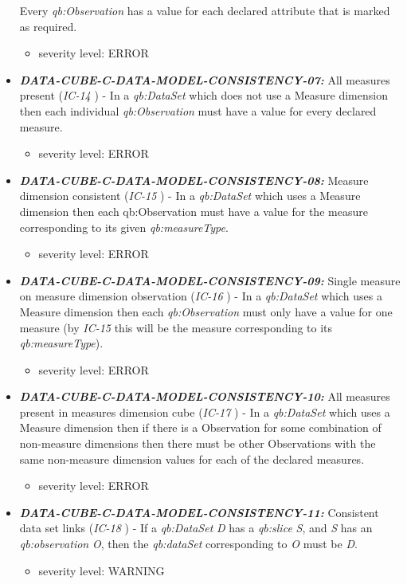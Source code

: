 \documentclass{llncs}
\begin{document}
\begin{itemize}
	Every \emph{qb:Observation} has a value for each declared attribute that is marked as required. 
	\begin{itemize}
		\item severity level: ERROR
	\end{itemize}
	\item \textbf{{\em DATA-CUBE-C-DATA-MODEL-CONSISTENCY-07:}}
	All measures present (\emph{IC-14} \cite{CyganiakReynolds2014}) -
	In a \emph{qb:DataSet} which does not use a Measure dimension then each individual \emph{qb:Observation} must have a value for every declared measure. 
	\begin{itemize}
		\item severity level: ERROR
	\end{itemize}
	\item \textbf{{\em DATA-CUBE-C-DATA-MODEL-CONSISTENCY-08:}}
	Measure dimension consistent (\emph{IC-15} \cite{CyganiakReynolds2014}) -
	In a \emph{qb:DataSet} which uses a Measure dimension then each qb:Observation must have a value for the measure corresponding to its given \emph{qb:measureType}. 
	\begin{itemize}
		\item severity level: ERROR
	\end{itemize}
	\item \textbf{{\em DATA-CUBE-C-DATA-MODEL-CONSISTENCY-09:}}
	Single measure on measure dimension observation (\emph{IC-16} \cite{CyganiakReynolds2014}) -
	In a \emph{qb:DataSet} which uses a Measure dimension then each \emph{qb:Observation} must only have a value for one measure (by \emph{IC-15} this will be the measure corresponding to its \emph{qb:measureType}). 
	\begin{itemize}
		\item severity level: ERROR
	\end{itemize}
	\item \textbf{{\em DATA-CUBE-C-DATA-MODEL-CONSISTENCY-10:}}
	All measures present in measures dimension cube (\emph{IC-17} \cite{CyganiakReynolds2014}) -
	In a \emph{qb:DataSet} which uses a Measure dimension then if there is a Observation for some combination of non-measure dimensions then there must be other Observations with the same non-measure dimension values for each of the declared measures. 
	\begin{itemize}
		\item severity level: ERROR
	\end{itemize}
	\item \textbf{{\em DATA-CUBE-C-DATA-MODEL-CONSISTENCY-11:}}
	Consistent data set links (\emph{IC-18} \cite{CyganiakReynolds2014}) -
	If a \emph{qb:DataSet} \emph{D} has a \emph{qb:slice} \emph{S}, and \emph{S} has an \emph{qb:observation} \emph{O}, then the \emph{qb:dataSet} corresponding to \emph{O} must be \emph{D}. 
	\begin{itemize}
		\item severity level: WARNING
	\end{itemize}
\end{itemize}
\end{document}
